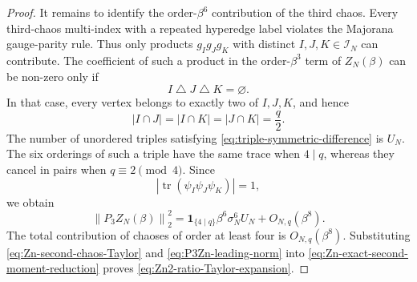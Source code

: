 \documentclass[11pt]{article}
\newcommand{\tr}{\operatorname{tr}}
\newcommand{\calI}{\mathcal{I}}
\newcommand{\ind}{\mathbf{1}}
\newcommand{\norm}[1]{\left\lVert #1\right\rVert}
\begin{document}
\begin{proof}
  It remains to identify the order-$\beta^6$ contribution of the third chaos.
  Every third-chaos multi-index with a repeated hyperedge label violates the
  Majorana gauge-parity rule.  Thus only products $g_Ig_Jg_K$ with distinct
  $I,J,K\in\calI_N$ can contribute.  The coefficient of such a product in
  the order-$\beta^3$ term of $Z_N(\beta)$ can be non-zero only if
  \begin{equation}\label{eq:triple-symmetric-difference}
    I\mathbin{\triangle}J\mathbin{\triangle}K=\varnothing.
  \end{equation}
  In that case, every vertex belongs to exactly two of $I,J,K$, and hence
  \begin{equation}\label{eq:triple-intersections}
    |I\cap J|
    =
    |I\cap K|
    =
    |J\cap K|
    =
    \frac q2.
  \end{equation}
  The number of unordered triples satisfying
  \eqref{eq:triple-symmetric-difference} is $U_N$.  The six orderings of such
  a triple have the same trace when $4\mid q$, whereas they cancel in pairs
  when $q\equiv2\pmod4$.  Since
  \begin{equation}\label{eq:triple-trace-magnitude}
    \left|
      \tr(\psi_I\psi_J\psi_K)
    \right|
    =
    1,
  \end{equation}
  we obtain
  \begin{equation}\label{eq:P3Zn-leading-norm}
    \norm{P_3Z_N(\beta)}_2^2
    =
    \ind_{\{4\mid q\}}
    \beta^6\sigma_N^6U_N
    +
    O_{N,q}(\beta^8).
  \end{equation}
  The total contribution of chaoses of order at least four is
  $O_{N,q}(\beta^8)$.  Substituting
  \eqref{eq:Zn-second-chaos-Taylor} and
  \eqref{eq:P3Zn-leading-norm} into
  \eqref{eq:Zn-exact-second-moment-reduction} proves
  \eqref{eq:Zn2-ratio-Taylor-expansion}.
\end{proof}
\end{document}
